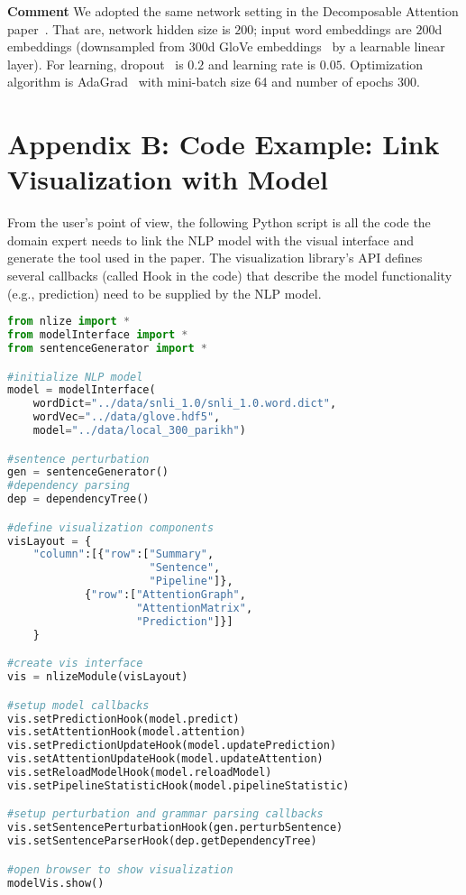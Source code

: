 \documentclass[review,journal]{vgtc}         %
\newcommand{\taoli}[1]{\textcolor{orange}{[#1]}}
\begin{document}

\textbf{Comment} We adopted the same network setting in the Decomposable Attention paper~\cite{parikh2016emnlp}. That are, network hidden size is $200$; input word embeddings are $200$d embeddings (downsampled from $300$d GloVe embeddings~\cite{PenningtonSocherManning2014} by a learnable linear layer). For learning, dropout~\cite{SrivastavaHinton2014} is $0.2$ and learning rate is $0.05$. Optimization algorithm is AdaGrad~\cite{duchi2011adaptive} with mini-batch size 64 and number of epochs 300.

\section{Appendix B: Code Example: Link Visualization with Model}
From the user's point of view, the following Python script is all the code the domain expert needs to link the NLP model with the visual interface and generate the tool used in the paper. The visualization library's API defines several callbacks (called Hook in the code) that describe the model functionality (e.g., prediction) need to be supplied by the NLP model.

\begin{lstlisting}[language=Python, caption=Code for generating the visualization.]
from nlize import *
from modelInterface import *
from sentenceGenerator import *

#initialize NLP model
model = modelInterface(
    wordDict="../data/snli_1.0/snli_1.0.word.dict",
    wordVec="../data/glove.hdf5", 
    model="../data/local_300_parikh")

#sentence perturbation
gen = sentenceGenerator()
#dependency parsing
dep = dependencyTree()

#define visualization components
visLayout = {
    "column":[{"row":["Summary", 
                      "Sentence", 
                      "Pipeline"]},
            {"row":["AttentionGraph", 
                    "AttentionMatrix", 
                    "Prediction"]}]
    }

#create vis interface
vis = nlizeModule(visLayout)

#setup model callbacks
vis.setPredictionHook(model.predict)
vis.setAttentionHook(model.attention)
vis.setPredictionUpdateHook(model.updatePrediction)
vis.setAttentionUpdateHook(model.updateAttention)
vis.setReloadModelHook(model.reloadModel)
vis.setPipelineStatisticHook(model.pipelineStatistic)

#setup perturbation and grammar parsing callbacks
vis.setSentencePerturbationHook(gen.perturbSentence)
vis.setSentenceParserHook(dep.getDependencyTree)

#open browser to show visualization
modelVis.show()

\end{lstlisting}

%
%
%


\end{document}
